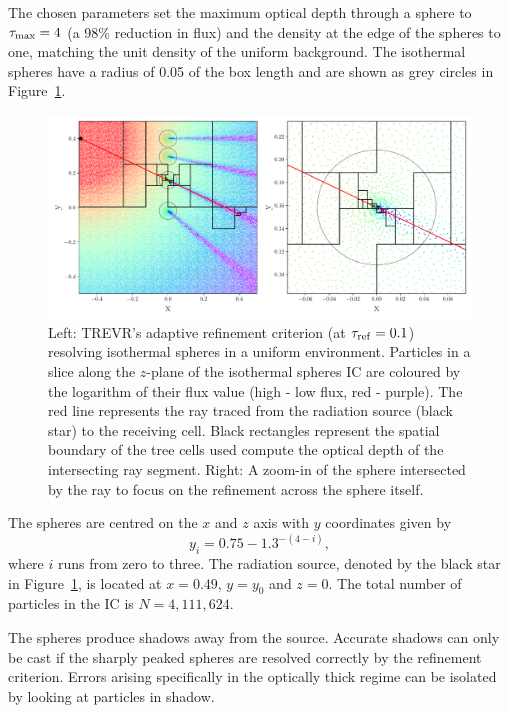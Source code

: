 \documentclass[fleq,usenatbib]{mnras}
\newcommand{\acro}{TREVR}
\newcommand{\tr}{\tau_{\rm ref}}
\begin{document}
{The chosen parameters set the maximum optical depth through a sphere to 
$\tau_{\rm max}=4$ (a 98\% reduction in flux) and the density at the edge of 
the spheres to one, matching the unit density of the uniform background. The 
isothermal spheres have a radius of 0.05 of the box length and are shown as 
grey circles in Figure~\ref{fig:cellplot}.  
\begin{figure}
\includegraphics[width=1\linewidth]{Figures/cellplot.pdf}
\caption{Left: \acro{}'s adaptive refinement criterion (at $\tr =0.1$) 
resolving isothermal spheres in a uniform environment. Particles in a slice 
along the $z$-plane of the isothermal spheres IC are coloured by the logarithm 
of their flux value (high - low flux, red - purple). The red line represents 
the ray traced from the radiation source (black star) to the receiving cell. 
Black rectangles represent the spatial boundary of the tree cells used compute 
the optical depth of the intersecting ray segment. Right: A zoom-in of the 
sphere intersected by the ray to focus on the refinement across the sphere 
itself.}
\label{fig:cellplot}
\end{figure}
The spheres are centred on the $x$ and $z$ axis with $y$ coordinates given by
\begin{equation}
y_i = 0.75 - 1.3^{-(4-i)},
\end{equation}
where $i$ runs from zero to three. The radiation source, denoted by the black 
star in Figure~\ref{fig:cellplot}, is located at $x=0.49$, $y=y_0$ and $z=0$. 
The total number of particles in the IC is $N=4,111,624$.

The spheres produce shadows away from the source. Accurate shadows can only be 
cast if the sharply peaked spheres are resolved correctly by the refinement 
criterion. Errors arising  specifically in the optically thick regime can be 
isolated by looking at particles in shadow.

}
\end{document}
